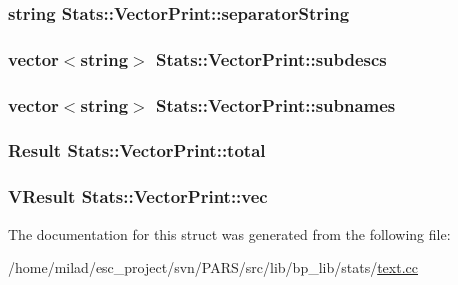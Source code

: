 \label{structStats_1_1VectorPrint_a944b839b2d16ab471f66013d6e543b26}
\hypertarget{structStats_1_1VectorPrint_a61e9ebc60bf9485f5a28c6b7fa0dcb88}{
\subsubsection[{separatorString}]{\setlength{\rightskip}{0pt plus 5cm}string {\bf Stats::VectorPrint::separatorString}}}
\label{structStats_1_1VectorPrint_a61e9ebc60bf9485f5a28c6b7fa0dcb88}
\hypertarget{structStats_1_1VectorPrint_ad41b5952812a233f57034740cd6193e2}{
\subsubsection[{subdescs}]{\setlength{\rightskip}{0pt plus 5cm}vector$<$string$>$ {\bf Stats::VectorPrint::subdescs}}}
\label{structStats_1_1VectorPrint_ad41b5952812a233f57034740cd6193e2}
\hypertarget{structStats_1_1VectorPrint_a584fa8575a02b844676d7dac1f99b8d5}{
\subsubsection[{subnames}]{\setlength{\rightskip}{0pt plus 5cm}vector$<$string$>$ {\bf Stats::VectorPrint::subnames}}}
\label{structStats_1_1VectorPrint_a584fa8575a02b844676d7dac1f99b8d5}
\hypertarget{structStats_1_1VectorPrint_a739c34030fdd6f5dfcc4df58420a4e9f}{
\subsubsection[{total}]{\setlength{\rightskip}{0pt plus 5cm}Result {\bf Stats::VectorPrint::total}}}
\label{structStats_1_1VectorPrint_a739c34030fdd6f5dfcc4df58420a4e9f}
\hypertarget{structStats_1_1VectorPrint_a0c73337c9840ea8e285fd5fbebaf90b1}{
\subsubsection[{vec}]{\setlength{\rightskip}{0pt plus 5cm}VResult {\bf Stats::VectorPrint::vec}}}
\label{structStats_1_1VectorPrint_a0c73337c9840ea8e285fd5fbebaf90b1}


The documentation for this struct was generated from the following file:\begin{DoxyCompactItemize}
\item 
/home/milad/esc\_\-project/svn/PARS/src/lib/bp\_\-lib/stats/\hyperlink{text_8cc}{text.cc}\end{DoxyCompactItemize}
